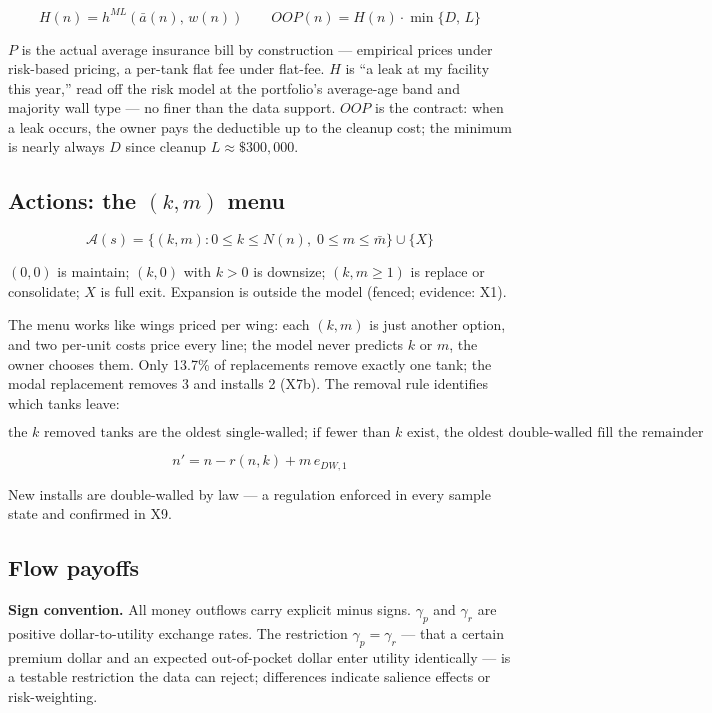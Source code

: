 \documentclass[
  letterpaper,
  DIV=11,
  numbers=noendperiod]{scrartcl}
\begin{document}
\[
H(n) = h^{ML}\!\left(\bar a(n),\, w(n)\right) \qquad
OOP(n) = H(n) \cdot \min\{D,\, L\}
\]

\(P\) is the actual average insurance bill by construction --- empirical
prices under risk-based pricing, a per-tank flat fee under flat-fee.
\(H\) is ``a leak at my facility this year,'' read off the risk model at
the portfolio's average-age band and majority wall type --- no finer
than the data support. \(OOP\) is the contract: when a leak occurs, the
owner pays the deductible up to the cleanup cost; the minimum is nearly
always \(D\) since cleanup \(L \approx \$300{,}000\).

\subsection{\texorpdfstring{Actions: the \((k,m)\)
menu}{Actions: the (k,m) menu}}\label{actions-the-km-menu}

\[
\mathcal{A}(s) = \{(k,m) : 0 \le k \le N(n),\; 0 \le m \le \bar m\} \cup \{X\}
\]

\((0,0)\) is maintain; \((k,0)\) with \(k > 0\) is downsize;
\((k, m \ge 1)\) is replace or consolidate; \(X\) is full exit.
Expansion is outside the model (fenced; evidence: X1).

The menu works like wings priced per wing: each \((k,m)\) is just
another option, and two per-unit costs price every line; the model never
predicts \(k\) or \(m\), the owner chooses them. Only 13.7\% of
replacements remove exactly one tank; the modal replacement removes 3
and installs 2 (X7b). The removal rule identifies which tanks leave:

\[
\text{the } k \text{ removed tanks are the oldest single-walled; if fewer than }
k \text{ exist, the oldest double-walled fill the remainder}
\]

\[
n' = n - r(n,k) + m\, e_{DW,1}
\]

New installs are double-walled by law --- a regulation enforced in every
sample state and confirmed in X9.

\subsection{Flow payoffs}\label{flow-payoffs}

\textbf{Sign convention.} All money outflows carry explicit minus signs.
\(\gamma_p\) and \(\gamma_r\) are positive dollar-to-utility exchange
rates. The restriction \(\gamma_p = \gamma_r\) --- that a certain
premium dollar and an expected out-of-pocket dollar enter utility
identically --- is a testable restriction the data can reject;
differences indicate salience effects or risk-weighting.
\end{document}
